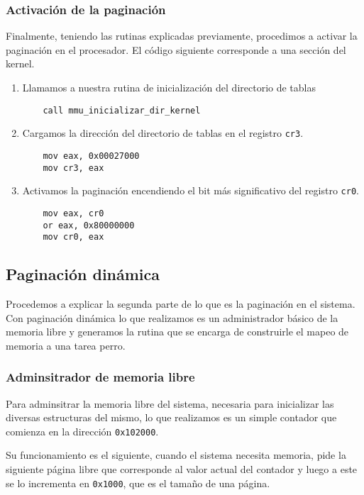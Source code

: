\subsubsection{Activación de la paginación}

Finalmente, teniendo las rutinas explicadas previamente, procedimos a activar la
paginación en el procesador. El código siguiente corresponde a una sección del
kernel.

\begin{enumerate}
	\item Llamamos a nuestra rutina de inicialización del directorio de tablas
	\begin{lstlisting}
	call mmu_inicializar_dir_kernel
	\end{lstlisting}

	\item Cargamos la dirección del directorio de tablas en el registro
		\texttt{cr3}.
	\begin{lstlisting}
	mov eax, 0x00027000
	mov cr3, eax
	\end{lstlisting}

	\item Activamos la paginación encendiendo el bit más significativo del
		registro \texttt{cr0}.
	\begin{lstlisting}
	mov eax, cr0
	or eax, 0x80000000
	mov cr0, eax
	\end{lstlisting}
\end{enumerate}

\subsection{Paginación dinámica}

Procedemos a explicar la segunda parte de lo que es la paginación en el sistema.
Con paginación dinámica lo que realizamos es un administrador básico de la
memoria libre y generamos la rutina que se encarga de construirle el mapeo de
memoria a una tarea perro.

\subsubsection{Adminsitrador de memoria libre}

Para adminsitrar la memoria libre del sistema, necesaria para inicializar
las diversas estructuras del mismo, lo que realizamos es un simple contador que
comienza en la dirección \texttt{0x102000}.

Su funcionamiento es el siguiente, cuando el sistema necesita memoria, pide la
siguiente página libre que corresponde al valor actual del contador y luego a
este se lo incrementa en \texttt{0x1000}, que es el tamaño de una página.

